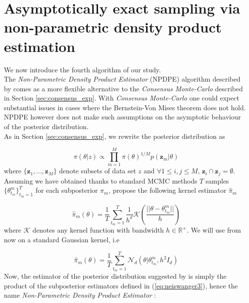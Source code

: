 \documentclass[11pt,a4paper]{report}\usepackage[]{graphicx}\usepackage[]{color}
\begin{document}
\section{Asymptotically exact sampling via non-parametric density product estimation}
\label{sec:neiswanger_exp}
We now introduce the fourth algorithm of our study.\\
The \textit{Non-Parametric Density Product Estimator} (NPDPE) algorithm described by \cite{neiswanger2013asymptotically} comes as a more flexible alternative to the \textit{Consensus Monte-Carlo} described in Section \ref{sec:consensus_exp}. With \textit{Consensus Monte-Carlo} one could expect substantial issues in cases where the Bernstein-Von Mises theorem does not hold. NPDPE however does not make such assumptions on the asymptotic behaviour of the posterior distribution.\\
As in Section \ref{sec:consensus_exp}, we rewrite the posterior distribution as

\begin{equation}
\label{eq:neiswanger1}
\pi(\theta|z)\propto\prod_{m=1}^M\pi(\theta)^{1/M}p(\textbf{z}_m|\theta)
\end{equation}
where $\{\textbf{z}_1, ..., \textbf{z}_M\}$ denote subsets of data set $z$ and $\forall 1\le i,j\le M$, $\textbf{z}_i\cap\textbf{z}_j=\emptyset$.
Assuming we have obtained thanks to standard MCMC methods $T$ samples $\{\theta_{t_m}^m\}_{t_m=1}^T$ for each subposterior $\pi_m$, \cite{neiswanger2013asymptotically} propose the following kernel estimator $\hat \pi_m$

\begin{equation}
\label{eq:neiswanger2}
    \hat \pi_m(\theta)=\frac1T\sum_{t_m=1}^T\frac{1}{h^d}\mathcal{K}\left(\frac{||\theta-\theta_{t_m}^m||}{h}\right)
\end{equation}
where $\mathcal K$ denotes any kernel function with bandwidth $h\in\mathbb R^{+}$. We will use from now on a standard Gaussian kernel, i.e 

\begin{equation}
\label{eq:neiswanger3}
    \hat \pi_m(\theta)=\frac1T\sum_{t_m=1}^T\mathcal{N}_d(\theta|\theta_{t_m}^m,h^2 I_d)
\end{equation}
Now, the estimator of the posterior distribution suggested by \cite{neiswanger2013asymptotically} is simply the product of the subposterior estimators defined in (\ref{eq:neiswanger3}), hence the name \textit{Non-Parametric Density Product Estimator} :
\end{document}
